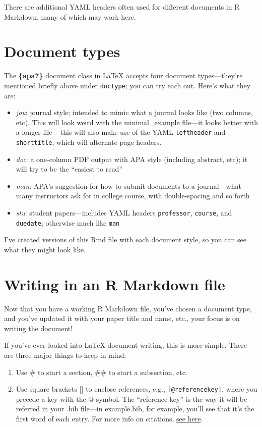 \documentclass[jou]{apa7}
\providecommand{\tightlist}{%
  \setlength{\itemsep}{0pt}\setlength{\parskip}{0pt}}
\begin{document}
There are additional YAML headers often used for different documents in
R Markdown, many of which may work here.

\hypertarget{document-types}{%
\section{Document types}\label{document-types}}

The \textbf{\{apa7\}} document class in LaTeX accepts four document
types---they're mentioned briefly above under \texttt{doctype}; you can
try each out. Here's what they are:

\begin{itemize}
\tightlist
\item
  \emph{jou}: journal style; intended to mimic what a journal looks like
  (two columns, etc). This will look weird with the minimal\_example
  file---it looks better with a longer file -- this will also make use
  of the YAML \texttt{leftheader} and \texttt{shorttitle}, which will
  alternate page headers.
\item
  \emph{doc}: a one-column PDF output with APA style (including
  abstract, etc); it will try to be the ``easiest to read''
\item
  \emph{man}: APA's suggestion for how to submit documents to a
  journal---what many instructors ask for in college course, with
  double-spacing and so forth
\item
  \emph{stu}: student papers---includes YAML headers \texttt{professor},
  \texttt{course}, and \texttt{duedate}; otherwise much like
  \texttt{man}
\end{itemize}

I've created versions of this Rmd file with each document style, so you
can see what they might look like.

\hypertarget{writing-in-an-r-markdown-file}{%
\section{Writing in an R Markdown
file}\label{writing-in-an-r-markdown-file}}

Now that you have a working R Markdown file, you've chosen a document
type, and you've updated it with your paper title and name, etc., your
focus is on writing the document!

If you've ever looked into LaTeX document writing, this is more simple.
There are three major things to keep in mind:

\begin{enumerate}
\def\labelenumi{\arabic{enumi}.}
\tightlist
\item
  Use \# to start a section, \#\# to start a subsection, etc.
\item
  Use square brackets {[}{]} to enclose references, e.g.,
  \texttt{{[}@referencekey{]}}, where you precede a key with the @
  symbol. The ``reference key'' is the way it will be referred in your
  .bib file---in example.bib, for example, you'll see that it's the
  first word of each entry. For more info on citations,
  \href{https://rmarkdown.rstudio.com/authoring_bibliographies_and_citations.html\#citations}{see
  here}.
\end{enumerate}
\end{document}
